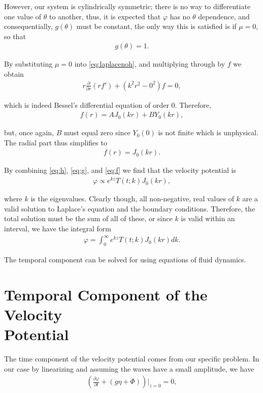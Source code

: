 However, our system is cylindrically symmetric; there is no way to differentiate one value of $\theta$ to another, thus, it is expected that $\varphi$ has no $\theta$ dependence, and consequentially, $g(\theta)$ must be constant, the only way this is satisfied is if $\mu = 0$, so that
\begin{align}
\label{eq:g}
g(\theta) = 1.
\end{align}

By substituting $\mu = 0$ into \eqref{eq:laplacenoh}, and multiplying through by $f$ we obtain
\begin{align*}
r \frac{\partial}{\partial r}(rf') + (k^2r^2 - 0^2)f = 0,
\end{align*}

which is indeed Bessel's differential equation of order $0$. Therefore,
\begin{align*}
f(r) = A J_0(kr) + B Y_0(kr),
\end{align*}

but, once again, $B$ must equal zero since $Y_0(0)$ is not finite which is unphysical. The radial part thus simplifies to
\begin{align}
\label{eq:f}
f(r) = J_0(kr).
\end{align}

By combining \eqref{eq:h}, \eqref{eq:g}, and \eqref{eq:f} we find that the velocity potential is 
\begin{align*}
\varphi \propto e^{kz}T(t;k)J_0(kr),
\end{align*}

where $k$ is the eigenvalues. Clearly though, all non-negative, real values of $k$ are a valid solution to Laplace's equation and the boundary conditions. Therefore, the total solution must be the sum of all of these, or since $k$ is valid within an interval, we have the integral form 
\begin{align}
\label{eq:phieigen}
\varphi = \int_0^\infty e^{kz}T(t;k)J_0(kr)dk.
\end{align}

The temporal component can be solved for using equations of fluid dynamics.

\section{Temporal Component of the Velocity \\ Potential}

The time component of the velocity potential comes from our specific problem. In our case by linearizing and assuming the waves have a small amplitude, we have
\begin{align*}
\left( \frac{\partial \varphi}{\partial t} + (g \eta + \Phi) \right) \bigg|_{z=0} = 0,
\end{align*}

